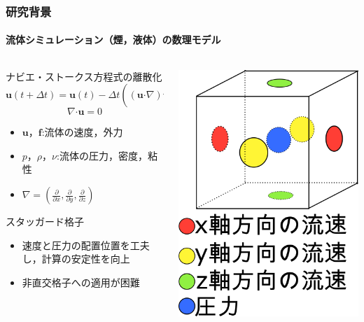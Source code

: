 \documentclass[aspectratio=169,dvipdfmx,hyperref={bookmarks=true}]{beamer}
\begin{document}
  \begin{frame}
  \frametitle{研究背景}
  \framesubtitle{流体シミュレーション（煙，液体）の数理モデル}

\begin{columns}[T]
	\begin{column}{0.65\linewidth}
	    \begin{block}{ナビエ・ストークス方程式の離散化}
    	\[
	\bm{u}(t + \varDelta t)  =\bm{u}(t) -\varDelta t( (\bm{u} \boldsymbol{\cdot}\nabla) \bm{u} - \frac{1}{\rho}\nabla p + \nu\nabla^2\bm{u} + \bm{f})
	\]
	\[
	\nabla\boldsymbol{\cdot}\bm{u} = 0
	\]
	\vspace{-10pt}
	\begin{itemize}
	\item $\bm{u}$，$\bm{f}$:流体の速度，外力
	\item $p$，$\rho$，$\nu$:流体の圧力，密度，粘性
	\item $\nabla = ( \frac{\partial}{\partial x}, \frac{\partial}{\partial y}, \frac{\partial}{\partial z})$
\end{itemize}
\end{block}
	\begin{block}{スタッガード格子}
		\begin{itemize}
		\item 速度と圧力の配置位置を工夫し，計算の安定性を向上
		\item 非直交格子への適用が困難
	\end{itemize}
	\end{block}
    	\end{column}
	\begin{column}{0.35\linewidth}
	\includegraphics[width=0.9\linewidth]{images/Macgrid.png}

\end{column}
\end{columns}
\end{frame}
\end{document}
